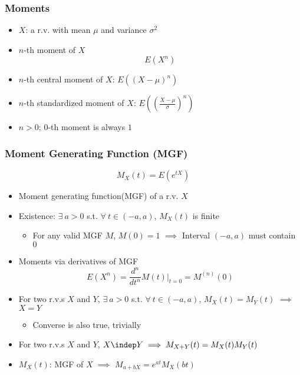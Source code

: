 \subsubsection*{Moments}
\begin{itemize}
    \item $X$: a r.v. with mean $\mu$ and variance $\sigma^2$
    \item $n$-th moment of $X$
    \begin{equation}
        E\left(X^n\right)
    \end{equation}
    \item $n$-th central moment of $X$: $E\left((X-\mu)^n\right)$
    \item $n$-th standardized moment of $X$: $E\left(\left(\frac{X-\mu}{\sigma}\right)^n\right)$
    \item $n>0$; $0$-th moment is always $1$
\end{itemize}

\subsubsection*{Moment Generating Function (MGF)}
\begin{equation}
    M_X(t)=E\left(e^{tX}\right)
\end{equation}
\begin{itemize}
    \item Moment generating function(MGF) of a r.v. $X$
    \item Existence: $\exists~a>0$ s.t. $\forall~t\in(-a,a)$, $M_X(t)$ is finite
    \begin{itemize}
        \item For any valid MGF $M$, $M(0)=1$ $\implies$ Interval $(-a,a)$ must contain $0$
    \end{itemize}
    \item Moments via derivatives of MGF
    \begin{equation}
        E\left(X^n\right)=\frac{d^n}{dt^n}M(t)\Bigr|_{t=0}=M^{(n)}(0)
    \end{equation}
    \item For two r.v.s $X$ and $Y$, $\exists~a>0$ s.t. $\forall~t\in(-a,a)$, $M_X(t)=M_Y(t)$ $\implies$ $X=Y$
    \begin{itemize}
        \item Converse is also true, trivially
    \end{itemize}
    \item For two r.v.s $X$ and $Y$, $X\indep Y\implies M_{X+Y}(t)=M_X(t)M_Y(t)$
    \item $M_X(t)$: MGF of $X$ $\implies$ $M_{a+bX}=e^{at}M_X(bt)$
\end{itemize}

